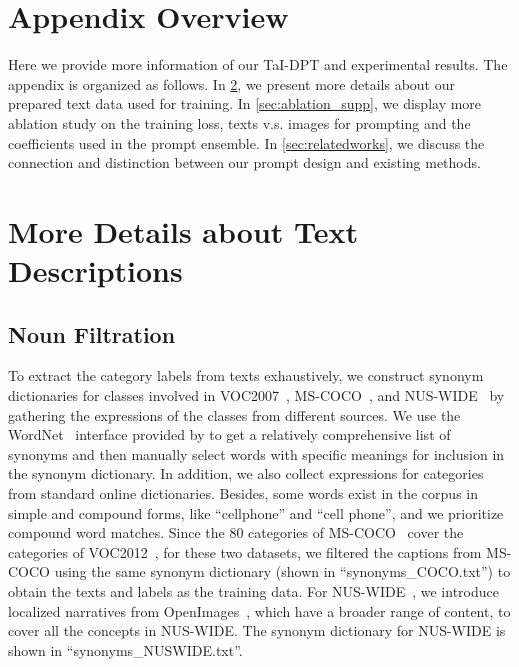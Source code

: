 \documentclass[10pt,twocolumn,letterpaper]{article}
\begin{document}
{\small


}


\newpage


\appendix
\section{Appendix Overview}
\label{sec:overview}
Here we provide more information of our TaI-DPT and experimental results. The appendix is organized as follows.
In \cref{sec:datasets}, we present more details about our prepared text data used for training.
In \cref{sec:ablation_supp}, we display more ablation study on the training loss, texts v.s. images for prompting and the coefficients used in the prompt ensemble.
In \cref{sec:relatedworks}, we discuss the connection and distinction between our prompt design and existing methods.


\section{More Details about Text Descriptions}
\label{sec:datasets}

\subsection{Noun Filtration}
To extract the category labels from texts exhaustively, we construct synonym dictionaries for classes involved in VOC2007~\cite{voc2007}, MS-COCO~\cite{coco}, and NUS-WIDE~\cite{nuswide} by gathering the expressions of the classes from different sources. We use the WordNet~\cite{wordnet} interface provided by \cite{bird2009natural} to get a relatively comprehensive list of synonyms and then manually select words with specific meanings for inclusion in the synonym dictionary. In addition, we also collect expressions for categories from standard online dictionaries. Besides, some words exist in the corpus in simple and compound forms, like ``cellphone'' and ``cell phone'', and we prioritize compound word matches.
Since the 80 categories of MS-COCO~\cite{coco} cover the categories of VOC2012~\cite{voc2007}, for these two datasets, we filtered the captions from MS-COCO using the same synonym dictionary (shown in ``synonyms\_COCO.txt'') to obtain the texts and labels as the training data. 
For NUS-WIDE~\cite{nuswide}, we introduce localized narratives from OpenImages~\cite{openimages}, which have a broader range of content, to cover all the concepts in NUS-WIDE. The synonym dictionary for NUS-WIDE is shown in ``synonyms\_NUSWIDE.txt''.
\end{document}
